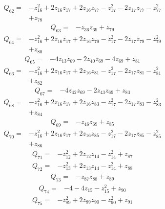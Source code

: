 \[\begin{aligned}Q_{62}={}&-z_{16}^{2}+2z_{16}z_{17}+2z_{16}z_{77}-z_{17}^{2}-2z_{17}z_{77}-z_{77}^{2}
\\&+z_{78}
\end{aligned}\]
\[\begin{aligned}Q_{63}={}&-z_{36}z_{69}+z_{79}
\end{aligned}\]
\[\begin{aligned}Q_{64}={}&-z_{16}^{2}+2z_{16}z_{17}+2z_{16}z_{79}-z_{17}^{2}-2z_{17}z_{79}-z_{79}^{2}
\\&+z_{80}
\end{aligned}\]
\[\begin{aligned}Q_{65}={}&-4z_{13}z_{69}-2z_{40}z_{69}-4z_{69}+z_{81}
\end{aligned}\]
\[\begin{aligned}Q_{66}={}&-z_{16}^{2}+2z_{16}z_{17}+2z_{16}z_{81}-z_{17}^{2}-2z_{17}z_{81}-z_{81}^{2}
\\&+z_{82}
\end{aligned}\]
\[\begin{aligned}Q_{67}={}&-4z_{42}z_{69}-2z_{43}z_{69}+z_{83}
\end{aligned}\]
\[\begin{aligned}Q_{68}={}&-z_{16}^{2}+2z_{16}z_{17}+2z_{16}z_{83}-z_{17}^{2}-2z_{17}z_{83}-z_{83}^{2}
\\&+z_{84}
\end{aligned}\]
\[\begin{aligned}Q_{69}={}&-z_{46}z_{69}+z_{85}
\end{aligned}\]
\[\begin{aligned}Q_{70}={}&-z_{16}^{2}+2z_{16}z_{17}+2z_{16}z_{85}-z_{17}^{2}-2z_{17}z_{85}-z_{85}^{2}
\\&+z_{86}
\end{aligned}\]
\[\begin{aligned}Q_{71}={}&-z_{12}^{2}+2z_{12}z_{14}-z_{14}^{2}+z_{87}
\end{aligned}\]
\[\begin{aligned}Q_{72}={}&-z_{13}^{2}+2z_{13}z_{14}-z_{14}^{2}+z_{88}
\end{aligned}\]
\[\begin{aligned}Q_{73}={}&-z_{87}z_{88}+z_{89}
\end{aligned}\]
\[\begin{aligned}Q_{74}={}&-4-4z_{15}-z_{15}^{2}+z_{90}
\end{aligned}\]
\[\begin{aligned}Q_{75}={}&-z_{89}^{2}+2z_{89}z_{90}-z_{90}^{2}+z_{91}
\end{aligned}\]
